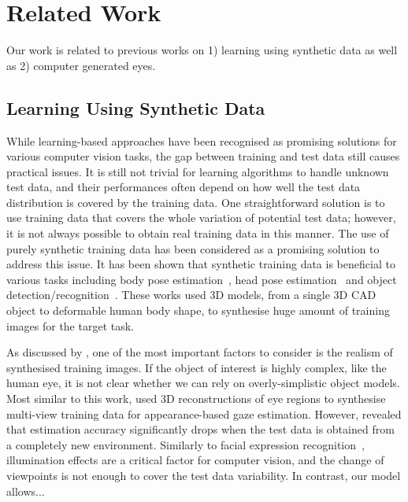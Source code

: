 
\section{Related Work}

Our work is related to previous works on 1) learning using synthetic data as well as 2) computer generated eyes.

\subsection{Learning Using Synthetic Data}

While learning-based approaches have been recognised as promising solutions for various computer vision tasks, the gap between training and test data still causes practical issues.
It is still not trivial for learning algorithms to handle unknown test data, and their performances often depend on how well the test data distribution is covered by the training data.
One straightforward solution is to use training data that covers the whole variation of potential test data; however, it is not always possible to obtain real training data in this manner.
The use of purely synthetic training data has been considered as a promising solution to address this issue.
It has been shown that synthetic training data is beneficial to various tasks including body pose estimation~\cite{shakhnarovich2003fast,okada2008relevant,shotton2013real}, head pose estimation~\cite{fanelli2011real} and object detection/recognition~\cite{yu2010improving,liebelt2010multiview,jaderberg2014synthetic}.
These works used 3D models, from a single 3D CAD object to deformable human body shape, to synthesise huge amount of training images for the target task.

As discussed by \citet{kaneva2011evaluation} , one of the most important factors to consider is the realism of synthesised training images.
If the object of interest is highly complex, like the human eye, it is not clear whether we can rely on overly-simplistic object models.
Most similar to this work, \citet{sugano2014learning} used 3D reconstructions of eye regions to synthesise multi-view training data for appearance-based gaze estimation.
However, \citet{zhang15_cvpr} revealed that estimation accuracy significantly drops when the test data is obtained from a completely new environment.
Similarly to facial expression recognition~\cite{stratou2011effect}, illumination effects are a critical factor for computer vision, and the change of viewpoints is not enough to cover the test data variability.
In contrast, our model allows...

